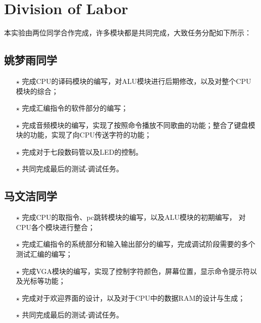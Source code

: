 \chapter{Division of Labor}
\kaishu
\hspace*{5mm}本实验由两位同学合作完成，许多模块都是共同完成，大致任务分配如下所示：
\songti
\section{姚梦雨同学}
\begin{itemize}
    \item[\color{blue}$\star$] 完成CPU的译码模块的编写，对ALU模块进行后期修改，以及对整个CPU
模块的综合；
    \item[\color{blue}$\star$] 完成汇编指令的软件部分的编写；
    \item[\color{blue}$\star$] 完成音频模块的编写，实现了按照命令播放不同歌曲的功能；整合了键盘模块的功能，实现了向CPU传送字符的功能；
    \item[\color{blue}$\star$] 完成对于七段数码管以及LED的控制。
    \item[\color{blue}$\star$] 共同完成最后的测试-调试任务。
\end{itemize}
\section{马文洁同学}
\begin{itemize}
    \item[\color{blue}$\star$] 完成CPU的取指令、pc跳转模块的编写，以及ALU模块的初期编写，
对CPU各个模块进行整合；
    \item[\color{blue}$\star$] 完成汇编指令的系统部分和输入输出部分的编写，完成调试阶段需要的多个测试汇编的编写；
    \item[\color{blue}$\star$] 完成VGA模块的编写，实现了控制字符颜色，屏幕位置，显示命令提示符以及光标等功能；
    \item[\color{blue}$\star$] 完成对于欢迎界面的设计，以及对于CPU中的数据RAM的设计与生成；
    \item[\color{blue}$\star$] 共同完成最后的测试-调试任务。
\end{itemize}